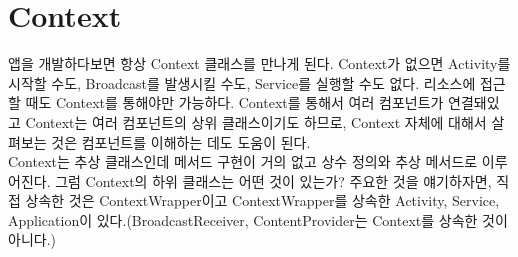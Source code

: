 \chapter{Context}
앱을 개발하다보면 항상 Context 클래스를 만나게 된다. Context가 없으면 Activity를 시작할 수도, Broadcast를 발생시킬 수도, Service를 실행할 수도 없다. 리소스에 접근할 때도 Context를 통해야만 가능하다.
Context를 통해서 여러 컴포넌트가 연결돼있고 Context는 여러 컴포넌트의 상위 클래스이기도 하므로, Context 자체에 대해서 살펴보는 것은 컴포넌트를 이해하는 데도 도움이 된다.\\

Context는 추상 클래스인데 메서드 구현이 거의 없고 상수 정의와 추상 메서드로 이루어진다. 
그럼 Context의 하위 클래스는 어떤 것이 있는가? 주요한 것을 얘기하자면, 직접 상속한 것은 ContextWrapper이고 ContextWrapper를 상속한 Activity, Service, Application이 있다.(BroadcastReceiver, ContentProvider는 Context를 상속한 것이 아니다.)\\


